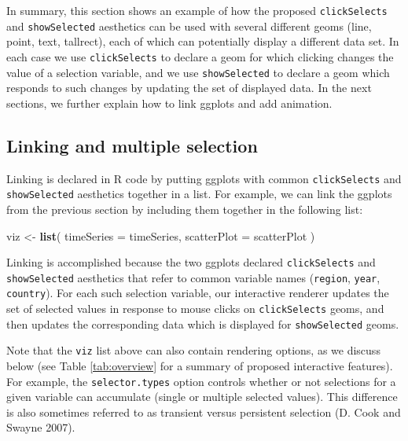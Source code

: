 \documentclass[12pt,]{article}
\newenvironment{Shaded}{\begin{snugshade}}{\end{snugshade}}
\newcommand{\DataTypeTok}[1]{\textcolor[rgb]{0.13,0.29,0.53}{#1}}
\newcommand{\KeywordTok}[1]{\textcolor[rgb]{0.13,0.29,0.53}{\textbf{#1}}}
\newcommand{\NormalTok}[1]{#1}
\newcommand{\StringTok}[1]{\textcolor[rgb]{0.31,0.60,0.02}{#1}}
\theoremstyle{definition}
\theoremstyle{definition}
\theoremstyle{definition}
\theoremstyle{remark}
\begin{document}
In summary, this section shows an example of how the proposed
\texttt{clickSelects} and \texttt{showSelected} aesthetics can be used
with several different geoms (line, point, text, tallrect), each of
which can potentially display a different data set. In each case we use
\texttt{clickSelects} to declare a geom for which clicking changes the
value of a selection variable, and we use \texttt{showSelected} to
declare a geom which responds to such changes by updating the set of
displayed data. In the next sections, we further explain how to link
ggplots and add animation.

\hypertarget{linking}{%
\subsection{Linking and multiple selection}\label{linking}}

Linking is declared in R code by putting ggplots with common
\texttt{clickSelects} and \texttt{showSelected} aesthetics together in a
list. For example, we can link the ggplots from the previous section by
including them together in the following list:

\begin{Shaded}
\begin{Highlighting}[]
\NormalTok{viz <-}\StringTok{ }\KeywordTok{list}\NormalTok{(}
  \DataTypeTok{timeSeries =}\NormalTok{ timeSeries,}
  \DataTypeTok{scatterPlot =}\NormalTok{ scatterPlot}
\NormalTok{)}
\end{Highlighting}
\end{Shaded}

Linking is accomplished because the two ggplots declared
\texttt{clickSelects} and \texttt{showSelected} aesthetics that refer to
common variable names (\texttt{region}, \texttt{year},
\texttt{country}). For each such selection variable, our interactive
renderer updates the set of selected values in response to mouse clicks
on \texttt{clickSelects} geoms, and then updates the corresponding data
which is displayed for \texttt{showSelected} geoms.

Note that the \texttt{viz} list above can also contain rendering
options, as we discuss below (see Table \ref{tab:overview} for a summary
of proposed interactive features). For example, the
\texttt{selector.types} option controls whether or not selections for a
given variable can accumulate (single or multiple selected values). This
difference is also sometimes referred to as transient versus persistent
selection (D. Cook and Swayne 2007).
\end{document}
